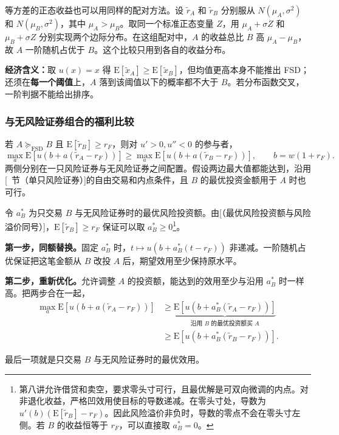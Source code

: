 等方差的正态收益也可以用同样的配对方法。设 $\tilde r_A$ 和 $\tilde r_B$ 分别服从 $N(\mu_A,\sigma^2)$ 和 $N(\mu_B,\sigma^2)$，其中 $\mu_A>\mu_B$。取同一个标准正态变量 $Z$，用 $\mu_A+\sigma Z$ 和 $\mu_B+\sigma Z$ 分别实现两个边际分布。在这组配对中，$A$ 的收益总比 $B$ 高 $\mu_A-\mu_B$，故 $A$ 一阶随机占优于 $B$。这个比较只用到各自的收益分布。

\textbf{经济含义：}取 $u(x)=x$ 得 $\mathrm E[\tilde x_A]\ge\mathrm E[\tilde x_B]$，但均值更高本身不能推出 FSD；还须在\textbf{每一个阈值}上，$A$ 落到该阈值以下的概率都不大于 $B$。若分布函数交叉，一阶判据不能给出排序。

\subsubsection{与无风险证券组合的福利比较}
\begin{tcolorbox}[knowledge]
 若 $A\succeq_{\mathrm{FSD}}B$ 且 $\mathrm E[\tilde r_B]\ge r_F$，则对 $u'>0,u''<0$ 的参与者，
\[
 \max_a\mathrm E[u(b+a(\tilde r_A-r_F))]
 \ge\max_a\mathrm E[u(b+a(\tilde r_B-r_F))],
 \qquad b=w(1+r_F).
\]
两侧分别在一只风险证券与无风险证券之间配置。假设两边最大值都能达到，沿用[~节（单只风险证券）]的自由交易和内点条件，且 $B$ 的最优投资金额用于 $A$ 时也可行。
\end{tcolorbox}
\begin{solution}[label-content={证明},blank-type=none]
令 $a_B^*$ 为只交易 $B$ 与无风险证券时的最优风险投资额。由[（最优风险投资额与风险溢价同号）]，$\mathrm E[\tilde r_B]\ge r_F$ 保证可以取 $a_B^*\ge0$\footnote{第八讲允许借贷和卖空，要求零头寸可行，且最优解是可双向微调的内点。对非退化收益，严格凹效用使目标的导数递减。在零头寸处，导数为 $u'(b)(\mathrm E[\tilde r_B]-r_F)$。因此风险溢价非负时，导数的零点不会在零头寸左侧。若 $B$ 的收益恒等于 $r_F$，可以直接取 $a_B^*=0$。}。

\textbf{第一步，同额替换。}固定 $a_B^*$ 时，$t\mapsto u(b+a_B^*(t-r_F))$ 非递减。一阶随机占优保证把这笔金额从 $B$ 改投 $A$ 后，期望效用至少保持原水平。

\textbf{第二步，重新优化。}允许调整 $A$ 的投资额，能达到的效用至少与沿用 $a_B^*$ 时一样高。把两步合在一起，
\[
\begin{aligned}
 \max_a\mathrm E[u(b+a(\tilde r_A-r_F))]
 &\ge\underbrace{\mathrm E[u(b+a_B^*(\tilde r_A-r_F))]}_{\text{沿用 }B\text{ 的最优投资额买 }A}\\
 &\ge\mathrm E[u(b+a_B^*(\tilde r_B-r_F))].
\end{aligned}
\]

最后一项就是只交易 $B$ 与无风险证券时的最优效用。
\end{solution}

